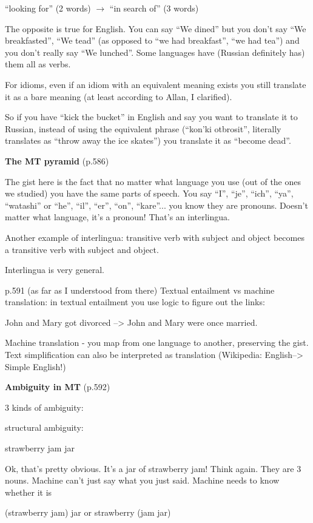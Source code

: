 ``looking for'' (2 words) $\rightarrow$ ``in search of'' (3 words)

The opposite is true for English. You can say ``We dined'' but you don't say
``We breakfasted'', ``We tead'' (as opposed to ``we had breakfast'', ``we had
tea'') and you don't really say ``We lunched''. Some languages have (Russian
definitely has) them all as verbs.

For idioms, even if an idiom with an equivalent meaning exists you still
translate it as a bare meaning (at least according to Allan, I clarified).

So if you have ``kick the bucket'' in English and say you want to translate it
to Russian, instead of using the equivalent phrase (``kon'ki otbrosit'',
literally translates as ``throw away the ice skates'') you translate it as
``become dead''.

\textbf{The MT pyramid} (p.586)

The gist here is the fact that no matter what language you use (out of the ones
we studied) you have the same parts of speech. You say ``I'', ``je'', ``ich'',
``ya'', ``watashi'' or ``he'', ``il'', ``er'', ``on'', ``kare''... you know they
are pronouns. Doesn't matter what language, it's a pronoun! That's an
interlingua.

Another example of interlingua: transitive verb with subject and object becomes
a transitive verb with subject and object.

Interlingua is very general.


p.591 (as far as I understood from there)  Textual entailment vs machine
translation: in textual entailment you use logic to figure out the links:

John and Mary got divorced --> John and Mary were once married.

Machine translation - you map from one language to another, preserving the gist.
Text simplification can also be interpreted as translation (Wikipedia:
English--> Simple English!)

\textbf{Ambiguity in MT} (p.592)

3 kinds of ambiguity:

structural ambiguity:

strawberry jam jar

Ok, that's pretty obvious. It's a jar of strawberry jam! Think again. They are 3
nouns. Machine can't just say what you just said. Machine needs to know whether
it is

(strawberry jam) jar or strawberry (jam jar)


